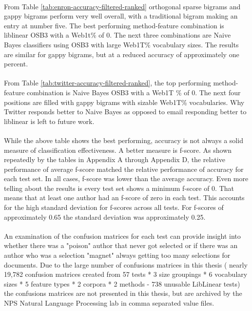 	
	\paragraph*{} From Table \ref{tab:enron-accuracy-filtered-ranked} orthogonal sparse bigrams and gappy bigrams perform very well overall, with a traditional bigram making an entry at number five.  The best performing method-feature combination is liblinear OSB3 with a Web1t\% of 0.  The next three combinations are Naive Bayes classifiers using OSB3 with large Web1T\% vocabulary sizes.  The results are similar for gappy bigrams, but at a reduced accuracy of approximately one percent.
	
	\paragraph*{} From Table \ref{tab:twitter-accuracy-filtered-ranked}, the top performing method-feature combination is Naive Bayes OSB3 with a Web1T \% of 0.  The next four positions are filled with gappy bigrams with sizable Web1T\% vocabularies.  Why Twitter responds better to Naive Bayes as opposed to email responding better to liblinear is left to future work.
	
	\paragraph*{} While the above table shows the best performing, accuracy is not always a solid measure of classification effectiveness.  A better measure is f-score.  As shown repeatedly by the tables in Appendix A through Appendix D, the relative performance of average f-score matched the relative performance of accuracy for each test set.  In all cases, f-score was lower than the average accuracy.  Even more telling about the results is every test set shows a minimum f-score of 0.  That means that at least one author had an f-score of zero in each test.  This accounts for the high standard deviation for f-scores across all tests.  For f-scores of approximately 0.65 the standard deviation was approximately 0.25.
	
	\paragraph*{} An examination of the confusion matrices for each test can provide insight into whether there was a "poison" author that never got selected or if there was an author who was a selection "magnet" always getting too many selections for documents.  Due to the large number of confusions matrices in this thesis ( nearly 19,782 confusion matrices created from 57 tests * 3 size groupings * 6 vocabulary sizes * 5 feature types * 2 corpora * 2 methods -  738 unusable LibLinear tests) the confusions matrices are not presented in this thesis, but are archived by the NPS Natural Language Processing lab in comma separated value files.

